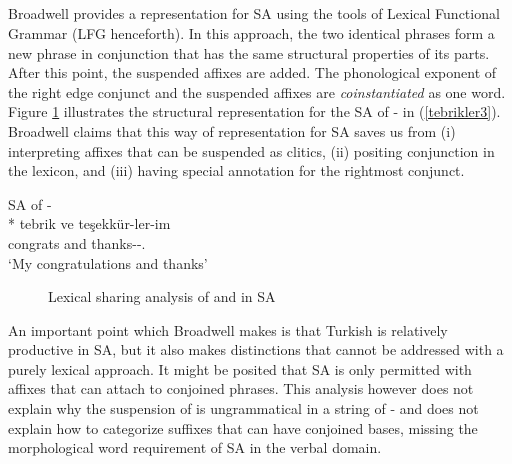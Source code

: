 \subsection{\citet{broadwell2008turkish}} \label{sec:broadwell}
Broadwell provides a representation for SA using the tools of Lexical Functional Grammar (LFG henceforth). In this approach, the two identical phrases form a new phrase in conjunction that has the same structural properties of its parts. After this point, the suspended affixes are added. The phonological exponent of the right edge conjunct and the suspended affixes are \textit{coinstantiated} as one word. Figure \ref{fig:lexicalshare} illustrates the structural representation for the SA of {\Pl-\Poss} in (\ref{tebrikler3}). Broadwell claims that this way of representation for SA saves us from (i) interpreting affixes that can be suspended as clitics, (ii) positing conjunction in the lexicon, and (iii) having special annotation for the rightmost conjunct.

\begin{exe}
    \ex \label{tebrikler3} SA of {\Pl-\Poss}\\*
    \gll tebrik ve teşekkür-ler-im \\ 
    congrats and thanks-{\Pl}-{\Poss}.{\Fsg} \\ 
    \glt `My congratulations and thanks'
\end{exe}
    
\begin{figure}[hbt!]
    \centering
{}
    \caption{Lexical sharing analysis of {\Pl} and {\Poss} in SA}
    \label{fig:lexicalshare}
\end{figure}

An important point which Broadwell makes is that Turkish is relatively productive in SA, but it also makes distinctions that cannot be addressed with a purely lexical approach. It might be posited that SA is only permitted with affixes that can attach to conjoined phrases. This analysis however does not explain why the suspension of {\Poss} is ungrammatical in a string of {\Pl-\Poss} and does not explain how to categorize suffixes that can have conjoined bases, missing the morphological word requirement of SA in the verbal domain.
